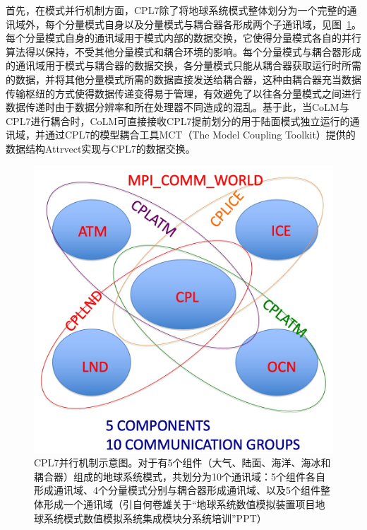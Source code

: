 首先，在模式并行机制方面，CPL7除了将地球系统模式整体划分为一个完整的通讯域外，每个分量模式自身以及分量模式与耦合器各形成两个子通讯域，见图~\ref{fig:CPL7并行机制示意图}。每个分量模式自身的通讯域用于模式内部的数据交换，它使得分量模式各自的并行算法得以保持，不受其他分量模式和耦合环境的影响。每个分量模式与耦合器形成的通讯域用于模式与耦合器的数据交换，各分量模式只能从耦合器获取运行时所需的数据，并将其他分量模式所需的数据直接发送给耦合器，这种由耦合器充当数据传输枢纽的方式使得数据传递变得易于管理，有效避免了以往各分量模式之间进行数据传递时由于数据分辨率和所在处理器不同造成的混乱。基于此，当CoLM与CPL7进行耦合时，CoLM可直接接收CPL7提前划分的用于陆面模式独立运行的通讯域，并通过CPL7的模型耦合工具MCT（The Model Coupling Toolkit）提供的数据结构Attrvect实现与CPL7的数据交换。

{
\begin{figure}[htbp]
\centering
\includegraphics{Figures/模式构架/CPL7并行机制示意图.png}
\caption[CPL7并行机制示意图]{CPL7并行机制示意图。对于有5个组件（大气、陆面、海洋、海冰和耦合器）组成的地球系统模式，共划分为10个通讯域：5个组件各自形成通讯域、4个分量模式分别与耦合器形成通讯域、以及5个组件整体形成一个通讯域（引自何卷雄关于“地球系统数值模拟装置项目地球系统模式数值模拟系统集成模块分系统培训”PPT）}
\label{fig:CPL7并行机制示意图}
\end{figure}
}

